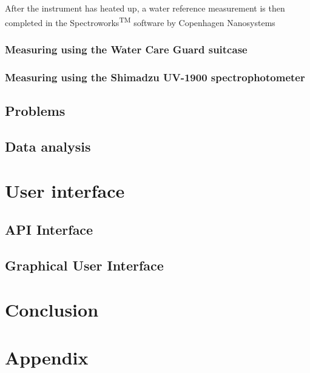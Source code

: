 \documentclass{article}
\begin{document}
After the instrument has heated up, a water reference measurement is then completed in the Spectroworks\textsuperscript{TM} software by Copenhagen Nanosystems

\subsubsection{Measuring using the Water Care Guard suitcase}
\subsubsection{Measuring using the Shimadzu UV-1900 spectrophotometer}
\subsection{Problems}
\subsection{Data analysis}

\newpage
\section{User interface}
\subsection{API Interface}
\subsection{Graphical User Interface}

\newpage
\section{Conclusion}

\newpage

\renewcommand*{\UrlFont}{\rmfamily}
\printbibliography

\section{Appendix}
\end{document}
